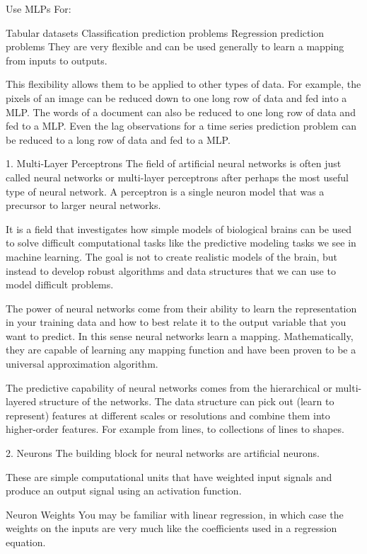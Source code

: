 \documentclass[12pt]{article}
\begin{document}
Use MLPs For:

Tabular datasets
Classification prediction problems
Regression prediction problems
They are very flexible and can be used generally to learn a mapping from inputs to outputs.

This flexibility allows them to be applied to other types of data. For example, the pixels of an image can be reduced down to one long row of data and fed into a MLP. The words of a document can also be reduced to one long row of data and fed to a MLP. Even the lag observations for a time series prediction problem can be reduced to a long row of data and fed to a MLP.


1. Multi-Layer Perceptrons
The field of artificial neural networks is often just called neural networks or multi-layer perceptrons after perhaps the most useful type of neural network. A perceptron is a single neuron model that was a precursor to larger neural networks.

It is a field that investigates how simple models of biological brains can be used to solve difficult computational tasks like the predictive modeling tasks we see in machine learning. The goal is not to create realistic models of the brain, but instead to develop robust algorithms and data structures that we can use to model difficult problems.

The power of neural networks come from their ability to learn the representation in your training data and how to best relate it to the output variable that you want to predict. In this sense neural networks learn a mapping. Mathematically, they are capable of learning any mapping function and have been proven to be a universal approximation algorithm.

The predictive capability of neural networks comes from the hierarchical or multi-layered structure of the networks. The data structure can pick out (learn to represent) features at different scales or resolutions and combine them into higher-order features. For example from lines, to collections of lines to shapes.

2. Neurons
The building block for neural networks are artificial neurons.

These are simple computational units that have weighted input signals and produce an output signal using an activation function.

Neuron Weights
You may be familiar with linear regression, in which case the weights on the inputs are very much like the coefficients used in a regression equation.
\end{document}
